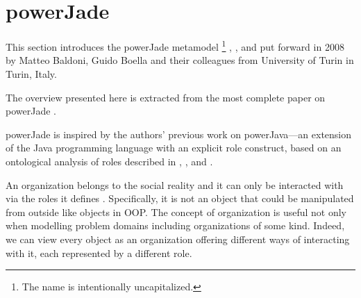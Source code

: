 
\section{powerJade}

This section introduces the powerJade metamodel
\footnote{The name is intentionally uncapitalized.}
\cite{Baldoni08a}, \cite{Baldoni08b}, \cite{Baldoni09} and \cite{Baldoni10}
put forward in 2008 by Matteo Baldoni, Guido Boella and their colleagues from University of Turin in Turin, Italy.

The overview presented here is extracted from the most complete paper on powerJade \cite{Baldoni10}.


powerJade is inspired by the authors' previous work on powerJava---an extension of the Java programming language with an explicit role construct, based on an ontological analysis of roles described in \cite{Baldoni05}, \cite{Baldoni06a}, \cite{Baldoni06b} and \cite{Baldoni07}.

An organization belongs to the social reality and it can only be interacted with via the roles it defines \cite{Boella06}.
Specifically, it is not an object that could be manipulated from outside like objects in OOP.
The concept of organization is useful not only when modelling problem domains including organizations of some kind.
Indeed, we can view every object as an organization offering different ways of interacting with it, each represented by a different role.

